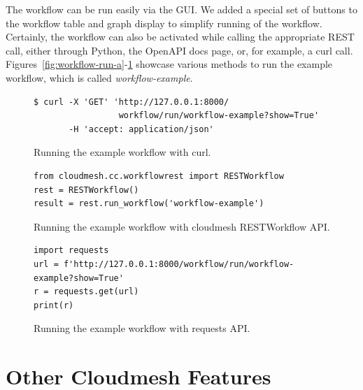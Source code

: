 \documentclass[sigplan,screen]{acmart}
\newcommand{\FILE}[1]{}
\begin{document}
The workflow can be run easily via the GUI. We added a special set of
buttons to the workflow table and graph display to simplify running of
the workflow. Certainly, the workflow can also be activated while
calling the appropriate REST call, either through Python, the OpenAPI
docs page, or, for example, a curl call.
Figures~\ref{fig:workflow-run-a}-\ref{fig:workflow-run-c}
showcase various methods to run the example workflow, which is called
{\em workflow-example}.


\begin{figure}[htb]

{\scriptsize\begin{verbatim}
$ curl -X 'GET' 'http://127.0.0.1:8000/
                 workflow/run/workflow-example?show=True'
       -H 'accept: application/json'
\end{verbatim}}%

\caption{Running the example workflow with curl.}
\label{fig:workflow-run-a}
\bigskip

{\scriptsize\begin{verbatim}
from cloudmesh.cc.workflowrest import RESTWorkflow
rest = RESTWorkflow()
result = rest.run_workflow('workflow-example')
\end{verbatim}}

\caption{Running the example workflow with cloudmesh RESTWorkflow API.}
\label{fig:workflow-run-b}
\bigskip

{\scriptsize\begin{verbatim}
import requests
url = f'http://127.0.0.1:8000/workflow/run/workflow-example?show=True'
r = requests.get(url)
print(r)
\end{verbatim}}

\caption{Running the example workflow with requests API.}
\label{fig:workflow-run-c}

\end{figure}









% 

\FILE{cloudmesh.tex}

\section{Other Cloudmesh Features}
\end{document}
